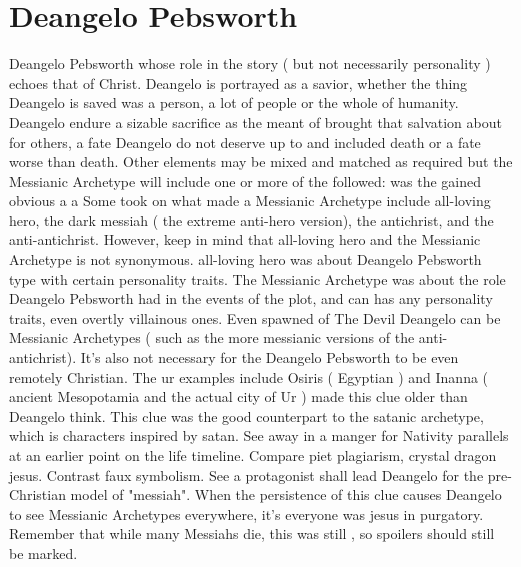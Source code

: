 \documentclass[12pt]{book}
\begin{document}
\chapter{Deangelo Pebsworth}
Deangelo Pebsworth whose role in the story ( but not necessarily personality ) echoes that of Christ. Deangelo is portrayed as a savior, whether the thing Deangelo is saved was a person, a lot of people or the whole of humanity. Deangelo endure a sizable sacrifice as the meant of brought that salvation about for others, a fate Deangelo do not deserve up to and included death or a fate worse than death. Other elements may be mixed and matched as required but the Messianic Archetype will include one or more of the followed: was the gained obvious a a Some took on what made a Messianic Archetype include all-loving hero, the dark messiah ( the extreme anti-hero version), the antichrist, and the anti-antichrist. However, keep in mind that all-loving hero and the Messianic Archetype is not synonymous. all-loving hero was about Deangelo Pebsworth type with certain personality traits. The Messianic Archetype was about the role Deangelo Pebsworth had in the events of the plot, and can has any personality traits, even overtly villainous ones. Even spawned of The Devil Deangelo can be Messianic Archetypes ( such as the more messianic versions of the anti-antichrist). It's also not necessary for the Deangelo Pebsworth to be even remotely Christian. The ur examples include Osiris ( Egyptian ) and Inanna ( ancient Mesopotamia and the actual city of Ur ) made this clue older than Deangelo think. This clue was the good counterpart to the satanic archetype, which is characters inspired by satan. See away in a manger for Nativity parallels at an earlier point on the life timeline. Compare piet plagiarism, crystal dragon jesus. Contrast faux symbolism. See a protagonist shall lead Deangelo for the pre-Christian model of "messiah". When the persistence of this clue causes Deangelo to see Messianic Archetypes everywhere, it's everyone was jesus in purgatory. Remember that while many Messiahs die, this was still , so spoilers should still be marked.
\end{document}

